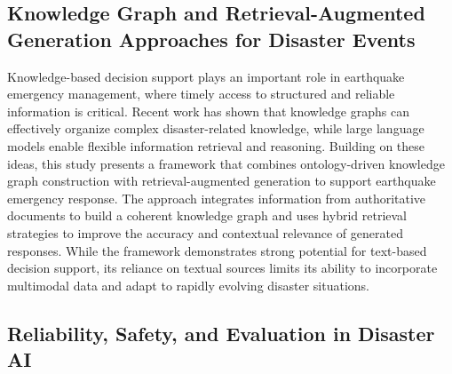 \documentclass[conference]{IEEEtran}
\begin{document}
\subsection{Knowledge Graph and Retrieval-Augmented Generation Approaches for Disaster Events}
Knowledge-based decision support plays an important role in earthquake emergency management, where timely access to structured and reliable information is critical. Recent work has shown that knowledge graphs can effectively organize complex disaster-related knowledge, while large language models enable flexible information retrieval and reasoning. Building on these ideas, this study presents a framework that combines ontology-driven knowledge graph construction with retrieval-augmented generation to support earthquake emergency response. The approach integrates information from authoritative documents to build a coherent knowledge graph and uses hybrid retrieval strategies to improve the accuracy and contextual relevance of generated responses. While the framework demonstrates strong potential for text-based decision support, its reliance on textual sources limits its ability to incorporate multimodal data and adapt to rapidly evolving disaster situations. ~\cite{b7}

\subsection{Reliability, Safety, and Evaluation in Disaster AI}
\end{document}
